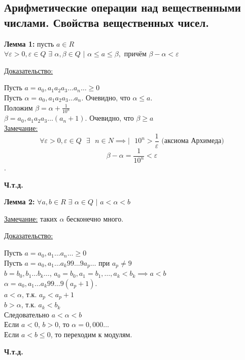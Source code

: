 \documentclass[12pt]{article}
\begin{document}
    \subsection{Арифметические операции над вещественными числами. Свойства вещественных чисел.}
    \textbf{Лемма 1:} пусть $a \in R$\\
    $\forall \varepsilon > 0, \varepsilon \in Q$ $\exists$ $\alpha, \beta \in Q$ $|$ $\alpha \le a \le \beta,$ причём $\beta - \alpha < \varepsilon$\par\noindent
    \underline{Доказательство:}
    \begin{adjustwidth}{1.5em}{1.5em}
        Пусть $a = a_{0},a_{1}a_{2}a_{3}\dots a_{n}\dots \ge 0$\\
        Пусть $\alpha = a_{0},a_{1}a_{2}a_{3}\dots a_{n}.$ Очевидно, что $\alpha \le a$.\\
        Положим $\beta = \alpha + \frac{1}{10^n}$\\
        $\beta = a_{0},a_{1}a_{2}a_{3}\dots (a_{n}+1)$. Очевидно, что $\beta \ge a$\\
        \underline{Замечание:} \[\forall \varepsilon > 0, \varepsilon \in Q \text{ } \exists \text{ } n \in N \implies | \text{ } 10^n > \frac{1}{\varepsilon} \text{ (аксиома Архимеда)}\]
        \[\beta - \alpha = \frac{1}{10^n} < \varepsilon\].
        \begin{center}
            \textbf{Ч.т.д.}
        \end{center}    
    \end{adjustwidth}

    \textbf{Лемма 2:} $\forall a,b \in R$ $\exists$ $\alpha \in Q$ $|$ $a < \alpha < b$\par\noindent
    \underline{Замечание:} таких $\alpha$ бесконечно много.\par\noindent
    \underline{Доказательство:} 
    \begin{adjustwidth}{1.5em}{1.5em}
        Пусть $a = a_{0},a_{1}\dots a_{n}\dots \ge 0$\\
        Пусть $a = a_{0},a_{1}\dots a_{k}99\dots9a_{p}\dots$ при $a_{p} \ne 9$\\
        $b = b_{0},b_{1}\dots b_{k}\dots$, $a_{0}=b_{0}, a_{1} = b_{1}, \dots, a_{k} < b_{k} \implies a < b$\\
        $\alpha = a_{0},a_{1}\dots a_{k}99\dots9(a_{p}+1)$.\\
        $a < \alpha$, т.к. $a_{p} < a_{p} + 1$\\
        $b > \alpha$, т.к. $a_{k} < b_{k}$\\
        Следовательно $a < \alpha < b$\\
        Если $a < 0$, $b > 0$, то $\alpha = 0,000\dots$\\
        Если $a < b \le 0$, то переходим к модулям.
        \begin{center}
            \textbf{Ч.т.д.}
        \end{center}
    \end{adjustwidth}
\end{document}
